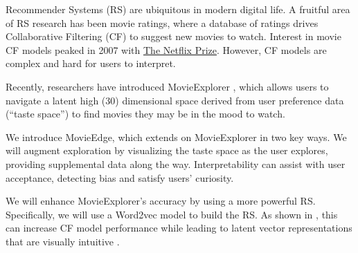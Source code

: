 Recommender Systems (RS) are ubiquitous in modern digital life. A fruitful area of RS research has been movie ratings, where a database of ratings drives Collaborative Filtering (CF) to suggest new movies to watch. Interest in movie CF models peaked in 2007 with \href{https://www.netflixprize.com/}{The Netflix Prize}. However, CF models are complex and hard for users to interpret.

Recently, researchers have introduced MovieExplorer \cite{taijala2018movieexplorer}, which allows users to navigate a latent high (30) dimensional space derived from user preference data (“taste space”) to find movies they may be in the mood to watch. 

We introduce MovieEdge, which extends on MovieExplorer in two key ways.  We will augment exploration by visualizing the taste space as the user explores, providing supplemental data along the way. Interpretability  \cite{Molnar2019interpretable} can assist with user acceptance, detecting bias and satisfy users’ curiosity. 

We will enhance MovieExplorer’s accuracy  by using a more powerful RS. Specifically, we will use a Word2vec model \cite{mikolov2013distributed} to build the RS. As shown in \cite{ozsoy2016word}, this can increase CF model performance while leading to latent vector representations that are visually intuitive \cite{mikolov2013distributed}. 